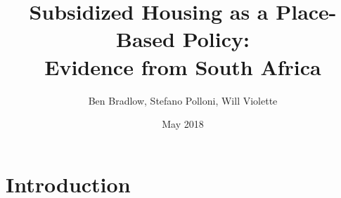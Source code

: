 \documentclass[aspectratio=149]{beamer}
\title{ Subsidized Housing as a Place-Based Policy: \\ Evidence from South Africa } %
\author{Ben Bradlow, Stefano Polloni, Will Violette}
\date{May 2018} %
\begin{document}
\beamertemplatenavigationsymbolsempty

\begin{frame}
\titlepage %
\end{frame}


\section{Introduction}
\end{document}
